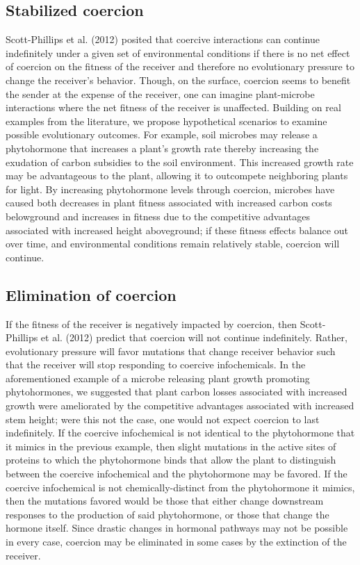 \documentclass[PhD]{msu-thesis}
\begin{document}
\subsection{Stabilized coercion}
Scott-Phillips et al. (2012) posited that coercive interactions can continue indefinitely under a given set of environmental conditions if there is no net effect of coercion on the fitness of the receiver and therefore no evolutionary pressure to change the receiver’s behavior. Though, on the surface, coercion seems to benefit the sender at the expense of the receiver, one can imagine plant-microbe interactions where the net fitness of the receiver is unaffected. Building on real examples from the literature, we propose hypothetical scenarios to examine possible evolutionary outcomes. For example, soil microbes may release a phytohormone that increases a plant’s growth rate thereby increasing the exudation of carbon subsidies to the soil environment. This increased growth rate may be advantageous to the plant, allowing it to outcompete neighboring plants for light. By increasing phytohormone levels through coercion, microbes have caused both decreases in plant fitness associated with increased carbon costs belowground and increases in fitness due to the competitive advantages associated with increased height aboveground; if these fitness effects balance out over time, and environmental conditions remain relatively stable, coercion will continue.

\subsection{Elimination of coercion}
If the fitness of the receiver is negatively impacted by coercion, then Scott-Phillips et al. (2012) predict that coercion will not continue indefinitely. Rather, evolutionary pressure will favor mutations that change receiver behavior such that the receiver will stop responding to coercive infochemicals. In the aforementioned example of a microbe releasing plant growth promoting phytohormones, we suggested that plant carbon losses associated with increased growth were ameliorated by the competitive advantages associated with increased stem height; were this not the case, one would not expect coercion to last indefinitely. If the coercive infochemical is not identical to the phytohormone that it mimics in the previous example, then slight mutations in the active sites of proteins to which the phytohormone binds that allow the plant to distinguish between the coercive infochemical and the phytohormone may be favored. If the coercive infochemical is not chemically-distinct from the phytohormone it mimics, then the mutations favored would be those that either change downstream responses to the production of said phytohormone, or those that change the hormone itself. Since drastic changes in hormonal pathways may not be possible in every case, coercion may be eliminated in some cases by the extinction of the receiver. 
\end{document}
